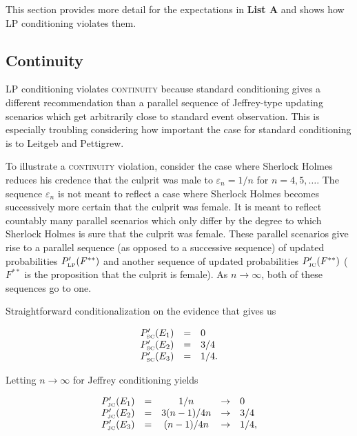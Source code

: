 \documentclass[12pt]{article}
\begin{document}
This section provides more detail for the expectations in \textbf{List
  A} and shows how LP conditioning violates them.

\subsection{Continuity}
\label{Continuity}

LP conditioning violates \textsc{continuity} because standard
conditioning gives a different recommendation than a parallel sequence
of Jeffrey-type updating scenarios which get arbitrarily close to
standard event observation. This is especially troubling considering
how important the case for standard conditioning is to Leitgeb and
Pettigrew.

To illustrate a \textsc{continuity} violation, consider the case where
Sherlock Holmes reduces his credence that the culprit was male to
$\varepsilon_{n}=1/n$ for $n=4,5,\ldots$. The sequence
$\varepsilon_{n}$ is not meant to reflect a case where Sherlock Holmes
becomes successively more certain that the culprit was female. It is
meant to reflect countably many parallel scenarios which only differ
by the degree to which Sherlock Holmes is sure that the culprit was
female. These parallel scenarios give rise to a parallel sequence (as
opposed to a successive sequence) of updated probabilities
$P'_{\mbox{\tiny LP}}(F^{**})$ and another sequence of updated
probabilities $P'_{\mbox{\tiny JC}}(F^{**})$ ($F^{**}$ is the
proposition that the culprit is female). As $n\rightarrow\infty$, both
of these sequences go to one.

Straightforward conditionalization on the evidence that  gives us 

\begin{equation}
  \label{eq:sherlockcontsc}
  \begin{array}{rcl}
  P'_{\mbox{\tiny SC}}(E_{1})&=&0\\
  P'_{\mbox{\tiny SC}}(E_{2})&=&3/4\\
  P'_{\mbox{\tiny SC}}(E_{3})&=&1/4.
\end{array}
\end{equation}

Letting $n\rightarrow\infty$ for Jeffrey conditioning yields

\begin{equation}
  \label{eq:sherlockcontjc}
  \begin{array}{rcccl}
  P'_{\mbox{\tiny JC}}(E_{1})&=&1/n&\rightarrow&0\\
  P'_{\mbox{\tiny JC}}(E_{2})&=&3(n-1)/4n&\rightarrow&3/4\\
  P'_{\mbox{\tiny JC}}(E_{3})&=&(n-1)/4n&\rightarrow&1/4,
\end{array}
\end{equation}
\end{document}
